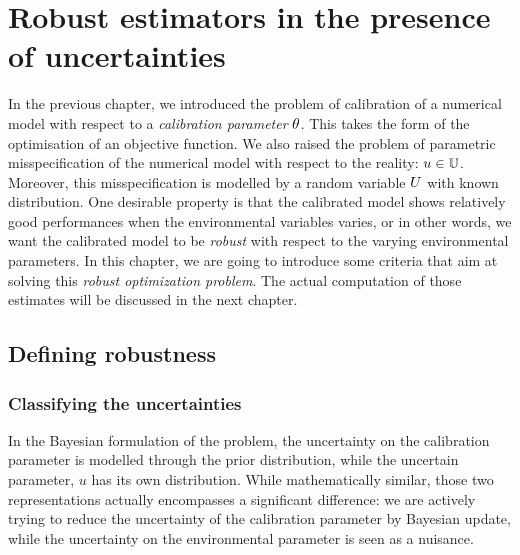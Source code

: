 \documentclass[../../Main_ManuscritThese.tex]{subfiles}
\begin{document}
\chapter{Robust estimators in the presence of uncertainties} 
\label{chap:robust_estimators}

\minitoc
\subfileLocal{\pagestyle{contentStyle}}
In the previous chapter, we introduced the problem of calibration of a numerical model with respect to a \emph{calibration parameter} $\theta$. This takes the form of the optimisation of an objective function. We also raised the problem of parametric misspecification of the numerical model with respect to the reality: $u \in \mathbb{U}$. Moreover, this misspecification is modelled by a random variable $U$ with known distribution.
One desirable property is that the calibrated model shows relatively good performances when the environmental variables varies, or in other words, we want the calibrated model to be \emph{robust} with respect to the varying environmental parameters. In this chapter, we are going to introduce some criteria that aim at solving this \emph{robust optimization problem}. The actual computation of those estimates will be discussed in the next chapter.

\section{Defining robustness}
\label{sec:def_robustness}
\subsection{Classifying the uncertainties}
In the Bayesian formulation of the problem, the uncertainty on the calibration parameter is modelled through the prior distribution, while the uncertain parameter, $u$ has its own distribution. While mathematically similar, those two representations actually encompasses a significant difference: we are actively trying to reduce the uncertainty of the calibration parameter by Bayesian update, while the uncertainty on the environmental parameter is seen as a nuisance.
\end{document}
